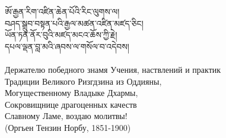 


{\ti ཨོ་རྒྱན་རིག་འཛིན་ཆེན་པོའི་རིང་ལུགས་ལ། \\
བཤད་སྒྲུབ་བསྟན་པའི་རྒྱལ་མཚན་འཛིན་མཛད་ཅིང།\\
 ཡོན་ཏན་ནོར་བུའི་མཛད་མངའ་ཆོས་ཀྱི་རྗེ། \\
དཔལ་ལྡན་བླ་མའི་ཞབས་ལ་གསོལ་བ་འདེབས།}\\
\\
\ru
Держателю победного знамя Учения, наствлений и практик\\
Традиции Великого Ризгдзина из Оддияны,\\
Могущественному Владыке Дхармы, \\
Сокровищнице драгоценных качеств \\
Славному Ламе, воздаю молитвы! \\
\hspace{1cm} (Оргьен Тензин Норбу, 1851-1900)\\
\\




